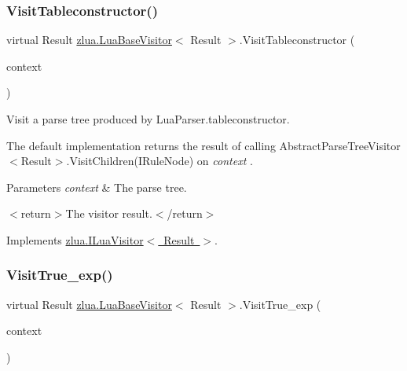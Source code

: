 \subsubsection{\texorpdfstring{Visit\+Tableconstructor()}{VisitTableconstructor()}}
{\footnotesize\ttfamily virtual Result \mbox{\hyperlink{classzlua_1_1_lua_base_visitor}{zlua.\+Lua\+Base\+Visitor}}$<$ Result $>$.Visit\+Tableconstructor (\begin{DoxyParamCaption}\item[{\mbox{[}\+Not\+Null\mbox{]} \mbox{\hyperlink{classzlua_1_1_lua_parser_1_1_tableconstructor_context}{Lua\+Parser.\+Tableconstructor\+Context}}}]{context }\end{DoxyParamCaption})\hspace{0.3cm}{\ttfamily [virtual]}}



Visit a parse tree produced by Lua\+Parser.\+tableconstructor. 

The default implementation returns the result of calling Abstract\+Parse\+Tree\+Visitor$<$\+Result$>$.\+Visit\+Children(\+I\+Rule\+Node) on {\itshape context} . 


\begin{DoxyParams}{Parameters}
{\em context} & The parse tree.\\
\hline
\end{DoxyParams}
$<$return$>$The visitor result.$<$/return$>$ 

Implements \mbox{\hyperlink{interfacezlua_1_1_i_lua_visitor_a8b04aaf49447f3a8883687237f88d60e}{zlua.\+I\+Lua\+Visitor$<$ Result $>$}}.

\mbox{\label{classzlua_1_1_lua_base_visitor_a63cf2709c52b89ca59db1826feef9c30}} 
\subsubsection{\texorpdfstring{Visit\+True\+\_\+exp()}{VisitTrue\_exp()}}
{\footnotesize\ttfamily virtual Result \mbox{\hyperlink{classzlua_1_1_lua_base_visitor}{zlua.\+Lua\+Base\+Visitor}}$<$ Result $>$.Visit\+True\+\_\+exp (\begin{DoxyParamCaption}\item[{\mbox{[}\+Not\+Null\mbox{]} \mbox{\hyperlink{classzlua_1_1_lua_parser_1_1_true__exp_context}{Lua\+Parser.\+True\+\_\+exp\+Context}}}]{context }\end{DoxyParamCaption})\hspace{0.3cm}{\ttfamily [virtual]}}



